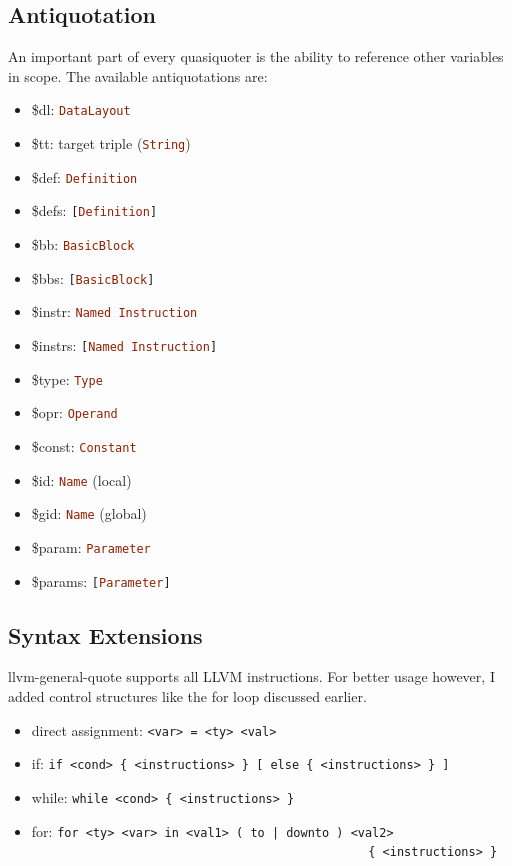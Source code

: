 \documentclass[a4paper,bibliography=totocnumbered,parskip,headsepline]{scrbook}
\begin{document}
\subsection{Antiquotation}
An important part of every quasiquoter is the ability to reference other variables in scope.
The available antiquotations are:
\begin{itemize}[noitemsep]
\item \$dl: \lstinline[language=haskell]!DataLayout!
\item \$tt: target triple (\lstinline[language=haskell]!String!)
\item \$def: \lstinline[language=haskell]!Definition!
\item \$defs: \lstinline[language=haskell]![Definition]!
\item \$bb: \lstinline[language=haskell]!BasicBlock!
\item \$bbs: \lstinline[language=haskell]![BasicBlock]!
\item \$instr: \lstinline[language=haskell]!Named Instruction!
\item \$instrs: \lstinline[language=haskell]![Named Instruction]!
\item \$type: \lstinline[language=haskell]!Type!
\item \$opr: \lstinline[language=haskell]!Operand!
\item \$const: \lstinline[language=haskell]!Constant!
\item \$id: \lstinline[language=haskell]!Name! (local)
\item \$gid: \lstinline[language=haskell]!Name! (global)
\item \$param: \lstinline[language=haskell]!Parameter!
\item \$params: \lstinline[language=haskell]![Parameter]!
\end{itemize}

\subsection{Syntax Extensions}
llvm-general-quote supports all LLVM instructions.
For better usage however, I added control structures like the for loop discussed earlier.

\begin{itemize}[noitemsep]
 \item direct assignment: \lstinline!<var> = <ty> <val>!
 \item if: \lstinline!if <cond> { <instructions> } [ else { <instructions> } ]!
 \item while: \lstinline!while <cond> { <instructions> }!
 \item for: \lstinline[deletekeywords={to}]!for <ty> <var> in <val1> ( to | downto ) <val2>!\\ \lstinline!                                               { <instructions> }!
\end{itemize}
\end{document}
